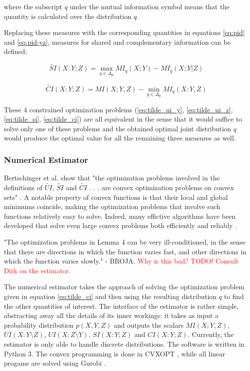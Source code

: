 \documentclass[12pt]{article}
\begin{document}
where the subscript $q$ under the mutual information symbol means that the quantity is calculated over the distribution $q$.

Replacing these measures with the corresponding quantities in equations \ref{eq:pid} and \ref{eq:pid-yz}, measures for shared and complementary information can be defined: 

\begin{equation}
\widetilde{SI}(X:Y;Z) = \max_{q \in \Delta_p} MI_q (X;Y) - MI_q(X;Y|Z)
\label{eq:tilde_si}
\end{equation}

\begin{equation}
\widetilde{CI}(X:Y;Z) = MI(X;Y,Z) - \min_{q \in \Delta_p} MI_q(X:Y,Z)
\label{eq:tilde_ci}
\end{equation}

These 4 constrained optimization problems (\ref{eq:tilde_ui_y}, \ref{eq:tilde_ui_z}, \ref{eq:tilde_si}, \ref{eq:tilde_ci}) are all equivalent in the sense that it would suffice to solve only one of these problems and the obtained optimal joint distribution $q$ would produce the optimal value for all the remaining three measures as well. 

\subsubsection{Numerical Estimator}

Bertschinger et al. show that "the optimization problems involved in the definitions of $\widetilde{UI}$, $\widetilde{SI}$ and $\widetilde{CI}$ . . . are convex optimization problems on convex sets" \cite{bertschinger}. A notable property of convex functions is that their local and global minimums coincide, making the optimization problems that involve such functions relatively easy to solve. Indeed, many effictive  algorithms have been developed that solve even large convex problems both efficiently and reliably \cite{boyd}.

"The optimization problems in Lemma 4 can be very ill-conditioned, in the sense that there are directions in which the function varies fast, and other directions in which the function varies slowly." - BROJA. \textcolor{red}{Why is this bad?}
\textcolor{red}{TODO! Consult Dirk on the estimator.}

The numerical estimator takes the approach of solving the optimization problem given in equation \ref{eq:tilde_ci} and then using the resulting distribution $q$ to find the other quantities of interest. The interface of the estimator is rather simple, abstracting away all the details of its inner workings: it takes as input a  probability distribution $p(X, Y, Z)$ and outputs the scalars $MI(X;Y,Z)$, $UI(X:Y \setminus Z)$, $UI(X:Z \setminus Y)$, $SI(X:Y;Z)$ and $CI(X:Y;Z)$. Currently, the estimator is only able to handle discrete distributions. The software is written in Python 3. The convex programming is done in CVXOPT \cite{cvxopt}, while all linear progams are solved using Gurobi \cite{gurobi}. 
\end{document}
